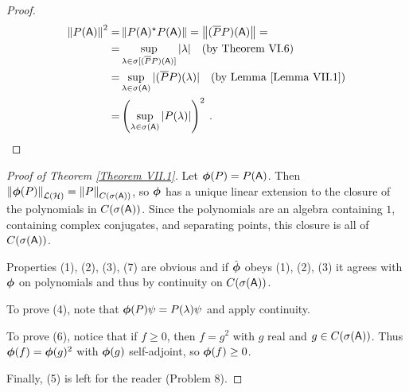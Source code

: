 \begin{proof}
    \begin{align}
        \left \Vert P(\mathsf{A}) \right \Vert^2 =& \left \Vert P(\mathsf{A})^\star P(\mathsf{A}) \right \Vert = \left \Vert (\overline{P} P)(\mathsf{A}) \right \Vert 
        = \\
        =& \sup_{\lambda \in \sigma [(\overline{P} P)(\mathsf{A})]} |\lambda| \quad \text{(by Theorem VI.6)} \nonumber \\
        =& \sup_{\lambda \in \sigma(\mathsf{A})} |(\overline{P} P)(\lambda)| \quad \text{(by Lemma \ref{Lemma VII.1})}  \nonumber \\
        =& \left( \sup_{\lambda \in \sigma(\mathsf{A})} |P(\lambda)| \right)^2 \:. \nonumber
    \end{align}
\end{proof}

\begin{proof}[Proof of Theorem \ref{Theorem VII.1}]
    Let $\boldsymbol{\phi}(P) = P(\mathsf{A})$. Then $ \left \Vert \boldsymbol{\phi}(P) \right \Vert_{\mathcal L(\mathcal{H})} = \left \Vert P \right \Vert_{C(\sigma(\mathsf{A}))} $, so $\boldsymbol{\phi}$ has a unique linear extension to the closure of the polynomials in $C(\sigma(\mathsf{A}))$. Since the polynomials are an algebra containing $1$, containing complex conjugates, and separating points, this closure is all of $C(\sigma(\mathsf{A}))$. 
    
    Properties (1), (2), (3), (7) are obvious and if $\hat {\boldsymbol{\phi}}$ obeys (1), (2), (3) it agrees with $\boldsymbol{\phi}$ on polynomials and thus by continuity on $C(\sigma(\mathsf{A}))$. 
    
    To prove (4), note that $\boldsymbol{\phi}(P)\psi = P(\lambda) \psi$ and apply continuity. 
    
    To prove (6), notice that if $f \geq 0$, then $f = g^2$ with $g$ real and $g \in C(\sigma( \mathsf{A}))$. Thus $\boldsymbol{\phi}(f) = \boldsymbol{\phi}(g)^2$ with $\boldsymbol{\phi}(g)$ self-adjoint, so $\boldsymbol{\phi}(f) \geq 0$.

    Finally, (5) is left for the reader (Problem 8).
    
\end{proof}

